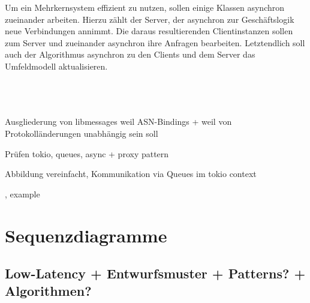 Um ein Mehrkernsystem effizient zu nutzen, sollen einige Klassen asynchron zueinander arbeiten.
Hierzu zählt der Server, der asynchron zur Geschäftslogik neue Verbindungen annimmt.
Die daraus resultierenden Clientinstanzen sollen zum Server und zueinander asynchron ihre Anfragen bearbeiten.
Letztendlich soll auch der Algorithmus asynchron zu den Clients und dem Server das Umfeldmodell aktualisieren.


~\\ ~\\ ~\\






Ausgliederung von libmessages weil ASN-Bindings + weil von Protokolländerungen unabhängig sein soll

Prüfen tokio, queues, async + proxy pattern

Abbildung vereinfacht, Kommunikation via Queues im tokio context


\cite[446]{goll2012methoden}, example \cite[457]{goll2012methoden}


\section{Sequenzdiagramme}

\subsection{Low-Latency + Entwurfsmuster + Patterns? + Algorithmen?}





